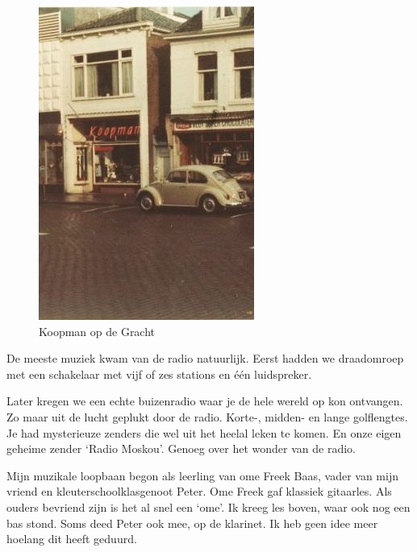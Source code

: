 \documentclass[10pt,twoside, openright]{memoir}
\begin{document}
\begin{figure}
\includegraphics[width=\textwidth]{img/ch23/koopm}
\caption*{\footnotesize Koopman op de Gracht}
\end{figure}

De meeste muziek kwam van de radio natuurlijk. Eerst hadden we draadomroep met een schakelaar met vijf of zes stations en één luidspreker. 

Later kregen we een echte buizenradio waar je de hele wereld op kon ontvangen. Zo maar uit de lucht geplukt door de radio. Korte-, midden- en lange golflengtes. Je had mysterieuze zenders die wel uit het heelal leken te komen. En onze eigen geheime zender `Radio Moskou’. Genoeg over het wonder van de radio.

Mijn muzikale loopbaan begon als leerling van ome Freek Baas, vader van mijn vriend en kleuterschoolklasgenoot Peter. Ome Freek gaf klassiek gitaarles. Als ouders bevriend zijn is het al snel een `ome'. Ik kreeg les boven, waar ook nog een bas stond. Soms deed Peter ook mee, op de klarinet. Ik heb geen idee meer hoelang dit heeft geduurd. 
\end{document}
